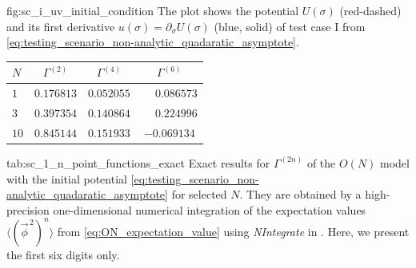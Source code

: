 	{fig:sc_i_uv_initial_condition} %
	{%
		The plot shows the \uv{} potential $U ( \sigma )$ (red-dashed) and its first derivative $u ( \sigma ) = \partial_\sigma U ( \sigma )$ (blue, solid) of test case I from \cref{eq:testing_scenario_non-analytic_quadaratic_asymptote}. 
	} %
	{%
		\renewcommand{\arraystretch}{1.15}
		\small
		\begin{tabular}{l c c c}
			\toprule
			$N$		&	$\Gamma^{(2)}$	&	$\Gamma^{(4)}$	&	$\Gamma^{(6)}$	\\
			\midrule
			$1$		&	$0.176813$		&	$0.052055$		&	$\phantom{-}0.086573$ \\
			$3$		&	$0.397354$		&	$0.140864$		&	$\phantom{-}0.224996$ \\
			$10$	&	$0.845144$		&	$0.151933$		&						$-0.069134$\\
			\bottomrule
		\end{tabular}
	} %
	{tab:sc_1_n_point_functions_exact}%
	{%
		Exact results for $\Gamma^{(2n)}$ of the $O(N)$ model with the \uv{} initial potential \eqref{eq:testing_scenario_non-analytic_quadaratic_asymptote} for selected $N$.
		They are obtained by a high-precision one-dimensional numerical integration of the expectation values $\langle ( \vec{\phi}^{\, 2} )^n \rangle$ from \cref{eq:ON_expectation_value} using \textit{NIntegrate} in \WAMXIIwR{}.
		Here, we present the first six digits only.
	} %
